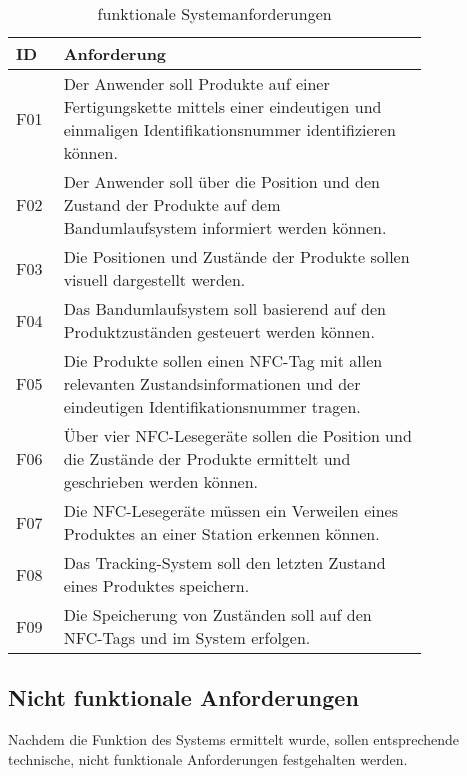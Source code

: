\begin{table}[H]
	\centering
	\caption{funktionale Systemanforderungen}
	\label{tab:f_anforderungen}
	\begin{tabular}{|p{0.075\linewidth}|p{0.75\linewidth}|}
		\hline
		\textbf{ID} & \textbf{Anforderung} \\ \hline
		
		F01 & Der Anwender soll Produkte auf einer Fertigungskette mittels einer eindeutigen und einmaligen Identifikationsnummer identifizieren können. \\ \hline
		F02 & Der Anwender soll über die Position und den Zustand der Produkte auf dem Bandumlaufsystem informiert werden können. \\ \hline
		F03 & Die Positionen und Zustände der Produkte sollen visuell dargestellt werden. \\ \hline
		F04 & Das Bandumlaufsystem soll basierend auf den Produktzuständen gesteuert werden können. \\ \hline
		F05 & Die Produkte sollen einen NFC-Tag mit allen relevanten Zustandsinformationen und der eindeutigen Identifikationsnummer tragen. \\ \hline
		F06 & Über vier NFC-Lesegeräte sollen die Position und die Zustände der Produkte ermittelt und geschrieben werden können. \\ \hline
		F07 & Die NFC-Lesegeräte müssen ein Verweilen eines Produktes an einer Station erkennen können. \\ \hline
		F08 & Das Tracking-System soll den letzten Zustand eines Produktes speichern. \\ \hline
		F09 & Die Speicherung von Zuständen soll auf den NFC-Tags und im System erfolgen. \\ \hline
	\end{tabular}
\end{table}


\subsection{Nicht funktionale Anforderungen}

Nachdem die Funktion des Systems ermittelt wurde, sollen entsprechende technische, nicht funktionale Anforderungen festgehalten werden. 

